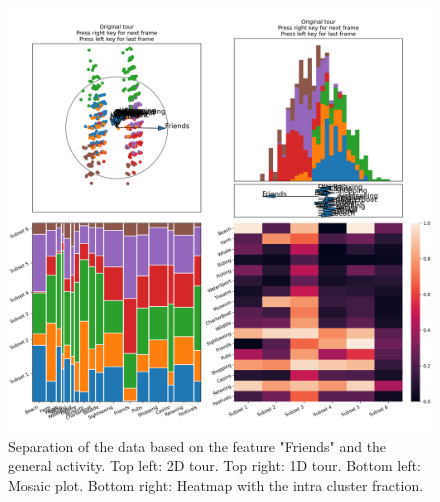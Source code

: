 \documentclass[article]{ajs}
\begin{document}
\begin{figure}[h!]
    \centering
    \includegraphics[width=1\textwidth]{aus_preselection.png}
    \caption{Separation of the data based on the feature "Friends" and the general activity. Top left: 2D tour. Top right: 1D tour. Bottom left: Mosaic plot. Bottom right: Heatmap with the intra cluster fraction.}
    \label{fig:aus_preselection}
\end{figure}
\end{document}
